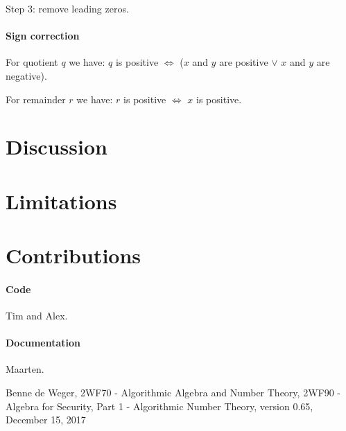 \documentclass[a4paper]{article}
\begin{document}
Step 3: remove leading zeros.


\paragraph{Sign correction}

For quotient $q$ we have: $q$ is positive $\iff$ ($x$ and $y$ are positive $\lor$ $x$ and $y$ are negative).

For remainder $r$ we have: $r$ is positive $\iff$ $x$ is positive.

\section{Discussion}




\section{Limitations}



\section{Contributions}

\paragraph{Code}

Tim and Alex.

\paragraph{Documentation}

Maarten.


\begin{thebibliography}{9}

  Benne de Weger,
  2WF70 - Algorithmic Algebra and Number Theory,
  2WF90 - Algebra for Security,
  Part 1 - Algorithmic Number Theory,
  version 0.65,
  December 15, 2017

\end{thebibliography}
\end{document}
